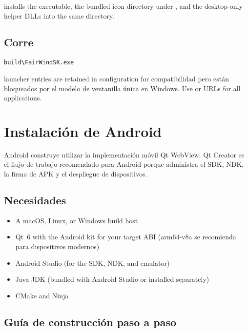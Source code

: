  installs the executable, the bundled icon
directory under , and the desktop-only
helper DLLs into the same  directory.

\subsection{Corre}

\begin{lstlisting}
build\FairWindSK.exe
\end{lstlisting}

\begin{notebox}
 launcher entries are retained in configuration for
compatibilidad pero están bloqueados por el modelo de ventanilla única en Windows.
Use  or  URLs for all applications.
\end{notebox}

\section{Instalación de Android}
\label{app:android}

Android construye utilizar la implementación móvil Qt WebView.
Qt Creator es el flujo de trabajo recomendado para Android porque administra
el SDK, NDK, la firma de APK y el despliegue de dispositivos.

\subsection{Necesidades}

\begin{itemize}
  \item A macOS, Linux, or Windows build host
  \item Qt~6 with the Android kit for your target ABI
(arm64-v8a se recomienda para dispositivos modernos)
  \item Android Studio (for the SDK, NDK, and emulator)
  \item Java JDK (bundled with Android Studio or installed separately)
  \item CMake and Ninja
\end{itemize}

\subsection{Guía de construcción paso a paso}

